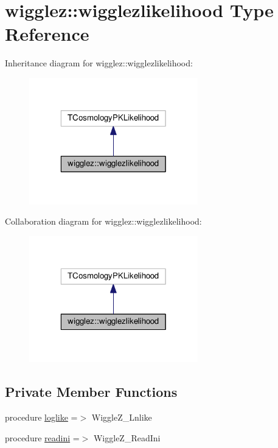 \hypertarget{structwigglez_1_1wigglezlikelihood}{}\section{wigglez\+:\+:wigglezlikelihood Type Reference}
\label{structwigglez_1_1wigglezlikelihood}


Inheritance diagram for wigglez\+:\+:wigglezlikelihood\+:
\nopagebreak
\begin{figure}[H]
\begin{center}
\leavevmode
\includegraphics[width=208pt]{structwigglez_1_1wigglezlikelihood__inherit__graph}
\end{center}
\end{figure}


Collaboration diagram for wigglez\+:\+:wigglezlikelihood\+:
\nopagebreak
\begin{figure}[H]
\begin{center}
\leavevmode
\includegraphics[width=208pt]{structwigglez_1_1wigglezlikelihood__coll__graph}
\end{center}
\end{figure}
\subsection*{Private Member Functions}
\begin{DoxyCompactItemize}
\item 
procedure \mbox{\hyperlink{structwigglez_1_1wigglezlikelihood_a095302f5116a1ab5105fc9bc98c5927d}{loglike}} =$>$ Wiggle\+Z\+\_\+\+Lnlike
\item 
procedure \mbox{\hyperlink{structwigglez_1_1wigglezlikelihood_a2aac98147fcac57fe94ddad4442fe952}{readini}} =$>$ Wiggle\+Z\+\_\+\+Read\+Ini
\end{DoxyCompactItemize}
